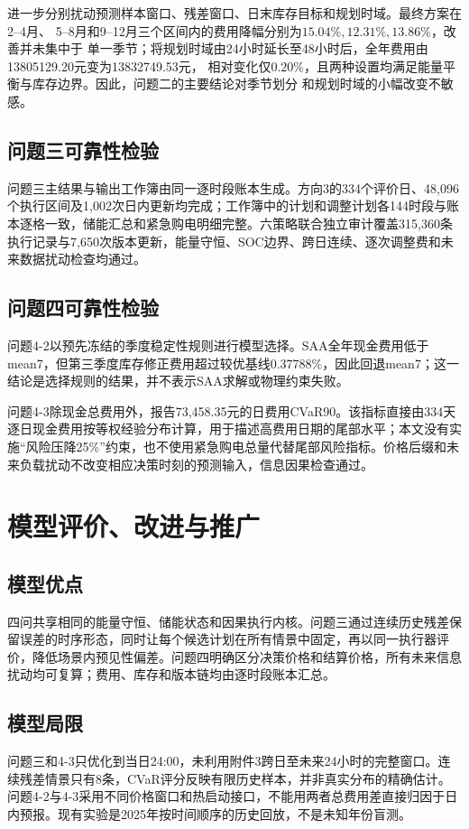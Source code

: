 \documentclass[UTF8,a4paper,12pt]{ctexart}
\begin{document}
进一步分别扰动预测样本窗口、残差窗口、日末库存目标和规划时域。最终方案在2--4月、
5--8月和9--12月三个区间内的费用降幅分别为$15.04\%,12.31\%,13.86\%$，改善并未集中于
单一季节；将规划时域由24小时延长至48小时后，全年费用由13805129.20元变为13832749.53元，
相对变化仅$0.20\%$，且两种设置均满足能量平衡与库存边界。因此，问题二的主要结论对季节划分
和规划时域的小幅改变不敏感。

\subsection{问题三可靠性检验}
问题三主结果与输出工作簿由同一逐时段账本生成。方向3的334个评价日、48,096个执行区间及1,002次日内更新均完成；工作簿中的计划和调整计划各144时段与账本逐格一致，储能汇总和紧急购电明细完整。六策略联合独立审计覆盖315,360条执行记录与7,650次版本更新，能量守恒、SOC边界、跨日连续、逐次调整费和未来数据扰动检查均通过。

\subsection{问题四可靠性检验}
问题4-2以预先冻结的季度稳定性规则进行模型选择。SAA全年现金费用低于mean7，但第三季度库存修正费用超过较优基线0.37788\%，因此回退mean7；这一结论是选择规则的结果，并不表示SAA求解或物理约束失败。

问题4-3除现金总费用外，报告73,458.35元的日费用CVaR90。该指标直接由334天逐日现金费用按等权经验分布计算，用于描述高费用日期的尾部水平；本文没有实施“风险压降25\%”约束，也不使用紧急购电总量代替尾部风险指标。价格后缀和未来负载扰动不改变相应决策时刻的预测输入，信息因果检查通过。


\section{模型评价、改进与推广}

\subsection{模型优点}
四问共享相同的能量守恒、储能状态和因果执行内核。问题三通过连续历史残差保留误差的时序形态，同时让每个候选计划在所有情景中固定，再以同一执行器评价，降低场景内预见性偏差。问题四明确区分决策价格和结算价格，所有未来信息扰动均可复算；费用、库存和版本链均由逐时段账本汇总。

\subsection{模型局限}
问题三和4-3只优化到当日24:00，未利用附件3跨日至未来24小时的完整窗口。连续残差情景只有8条，CVaR评分反映有限历史样本，并非真实分布的精确估计。问题4-2与4-3采用不同价格窗口和热启动接口，不能用两者总费用差直接归因于日内预报。现有实验是2025年按时间顺序的历史回放，不是未知年份盲测。
\end{document}
